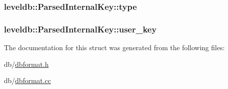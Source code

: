 \subsubsection[{type}]{ leveldb\+::\+Parsed\+Internal\+Key\+::type}\label{structleveldb_1_1_parsed_internal_key_ac7c10a6f60f93982b886ad1fbbafd6c2}
\hypertarget{structleveldb_1_1_parsed_internal_key_aa6e30fcf3c95fc1485d60fa08efe2b9d}{}
\subsubsection[{user\+\_\+key}]{ leveldb\+::\+Parsed\+Internal\+Key\+::user\+\_\+key}\label{structleveldb_1_1_parsed_internal_key_aa6e30fcf3c95fc1485d60fa08efe2b9d}


The documentation for this struct was generated from the following files\+:\begin{DoxyCompactItemize}
\item 
db/\hyperlink{dbformat_8h}{dbformat.\+h}\item 
db/\hyperlink{dbformat_8cc}{dbformat.\+cc}\end{DoxyCompactItemize}
